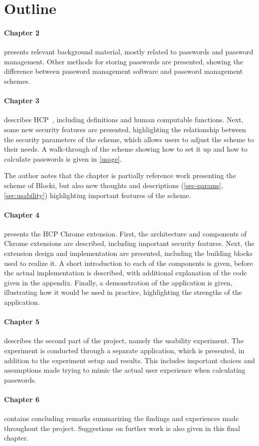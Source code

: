 \section{Outline}
\paragraph{Chapter 2} presents relevant background material, mostly related to passwords and password management. Other methods for storing passwords are presented, showing the difference between password management software and password management schemes.
\paragraph{Chapter 3} describes HCP~\cite{hcp-blocki}, including definitions and human computable functions. Next, some new security features are presented, highlighting the relationship between the security parameters of the scheme, which allows users to adjust the scheme to their needs. A walk-through of the scheme showing how to set it up and how to calculate passwords is given in \autoref{usage}.
\par The author notes that the chapter is partially reference work presenting the scheme of Blocki, but also new thoughts and descriptions (\autoref{sec-params}, \autoref{sec:usability}) highlighting important features of the scheme. 
\paragraph{Chapter 4} presents the HCP Chrome extension. First, the architecture and components of Chrome extensions are described, including important security features. Next, the extension design and implementation are presented, including the building blocks used to realize it. A short introduction to each of the components is given, before the actual implementation is described, with additional explanation of the code given in the appendix. Finally, a demonstration of the application is given, illustrating how it would be used in practice, highlighting the strengths of the application.
\paragraph{Chapter 5} describes the second part of the project, namely the usability experiment. The experiment is conducted through a separate application, which is presented, in addition to the experiment setup and results. This includes important choices and assumptions made trying to mimic the actual user experience when calculating passwords.
\paragraph{Chapter 6} contains concluding remarks summarizing the findings and experiences made throughout the project. Suggestions on further work is also given in this final chapter.


